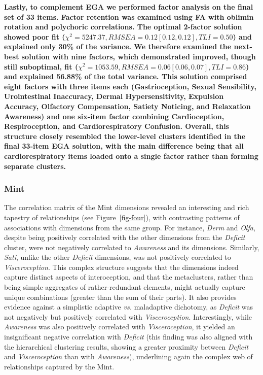 \documentclass[
  man,
  floatsintext,
  longtable,
  nolmodern,
  notxfonts,
  notimes,
  mask,
  colorlinks=true,linkcolor=blue,citecolor=blue,urlcolor=blue]{apa7}
\begin{document}
\textbf{Lastly, to complement EGA we performed factor analysis on the
final set of 33 items. Factor retention was examined using FA with
oblimin rotation and polychoric correlations. The optimal 2-factor
solution showed poor fit
(\(\chi^2 = 5247.37, RMSEA = 0.12 [0.12, 0.12], TLI = 0.50\)) and
explained only 30\% of the variance. We therefore examined the next-best
solution with nine factors, which demonstrated improved, though still
suboptimal, fit
(\(\chi^2 = 1053.59, RMSEA = 0.06 [0.06, 0.07], TLI = 0.86\)) and
explained 56.88\% of the total variance. This solution comprised eight
factors with three items each (Gastrioception, Sexual Sensibility,
Urointestinal Inaccuracy, Dermal Hypersensitivity, Expulsion Accuracy,
Olfactory Compensation, Satiety Noticing, and Relaxation Awareness) and
one six-item factor combining Cardioception, Respiroception, and
Cardiorespiratory Confusion. Overall, this structure closely resembled
the lower-level clusters identified in the final 33-item EGA solution,
with the main difference being that all cardiorespiratory items loaded
onto a single factor rather than forming separate clusters.}

\subsubsection{Mint}\label{mint}

The correlation matrix of the Mint dimensions revealed an interesting
and rich tapestry of relationships (see Figure~\ref{fig-four}), with
contrasting patterns of associations with dimensions from the same
group. For instance, \emph{Derm} and \emph{Olfa}, despite being
positively correlated with the other dimensions from the \emph{Deficit}
cluster, were not negatively correlated to \emph{Awareness} and its
dimensions. Similarly, \emph{Sati}, unlike the other \emph{Deficit}
dimensions, was not positively correlated to \emph{Visceroception}. This
complex structure suggests that the dimensions indeed capture distinct
aspects of interoception, and that the metaclusters, rather than being
simple aggregates of rather-redundant elements, might actually capture
unique combinations (greater than the sum of their parts). It also
provides evidence against a simplistic adaptive \emph{vs.} maladaptive
dichotomy, as \emph{Deficit} was not negatively but positively
correlated with \emph{Visceroception}. Interestingly, while
\emph{Awareness} was also positively correlated with
\emph{Visceroception}, it yielded an insignificant negative correlation
with \emph{Deficit} (this finding was also aligned with the hierarchical
clustering results, showing a greater proximity between \emph{Deficit}
and \emph{Visceroception} than with \emph{Awareness}), underlining again
the complex web of relationships captured by the Mint.
\end{document}
